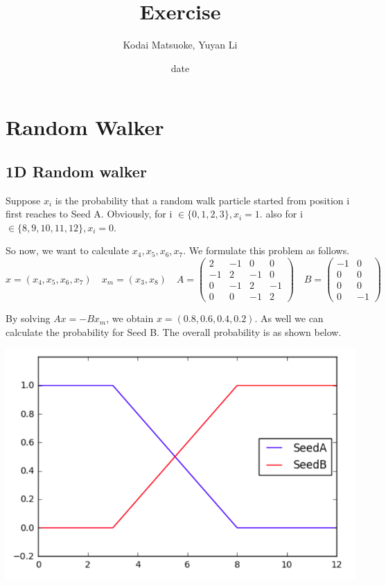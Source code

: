 \documentclass[12pt,a4paper]{scrartcl}
\author{Kodai Matsuoke, Yuyan Li}
\title{Exercise }
\date{date}
\begin{document}
\maketitle

% 

\section{Random Walker}
\subsection{1D Random walker}
Suppose \(x_{i}\) is the probability that a random walk particle started from position i first reaches to Seed A.
Obviously, for i \(\in \{0,1,2,3\}, x_{i}=1\). also for i \(\in \{8,9,10,11,12\}, x_{i}=0\).


So now, we want to calculate \(x_{4},x_{5},x_{6},x_{7}\). We formulate this problem as follows.
\[
x = (x_{4},x_{5},x_{6},x_{7})
\quad
x_{m} = (x_{3},x_{8})
\quad
A = 
\left(
\begin{array}{cccc}
	2 & -1 & 0 & 0
	\\
	-1 & 2 & -1 & 0
	\\
	0 & -1 & 2 & -1
	\\
	0 & 0 & -1 & 2
\end{array}
\right)
\quad
B = 
\left(
\begin{array}{cc}
	-1 & 0
	\\
	0 & 0
	\\
	0 & 0
	\\
	0 & -1
\end{array}
\right)
\]

By solving \(Ax = -Bx_{m}\), we obtain \(x = (0.8, 0.6, 0.4, 0.2)\). As well we can calculate the probability for Seed B.
The overall probability is as shown below.

\includegraphics[scale = 0.4]{1_1.png}
\end{document}
